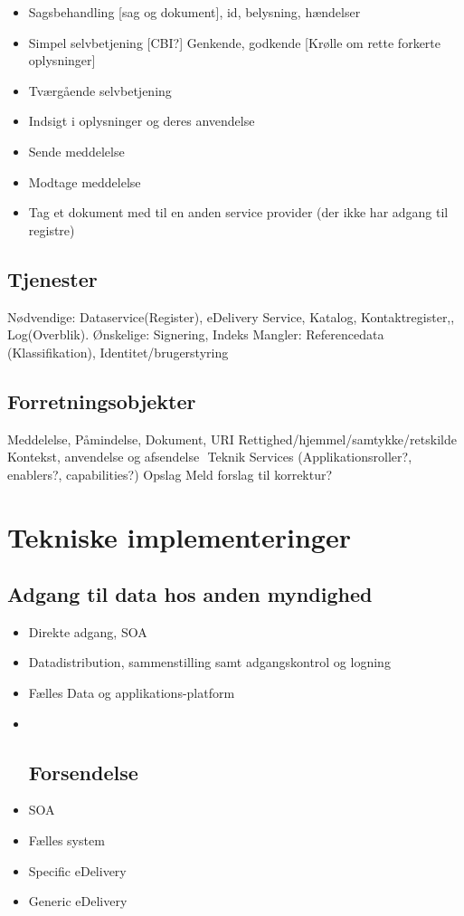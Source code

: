 \begin{itemize}
\item
  Sagsbehandling {[}sag og dokument{]}, id, belysning, hændelser
\item
  Simpel selvbetjening {[}CBI?{]} Genkende, godkende {[}Krølle om rette
  forkerte oplysninger{]}
\item
  Tværgående selvbetjening
\item
  Indsigt i oplysninger og deres anvendelse
\item
  Sende meddelelse
\item
  Modtage meddelelse
\item
  Tag et dokument med til en anden service provider (der ikke har adgang
  til registre)
\end{itemize}

\subsection{Tjenester}\label{tjenester}

Nødvendige: Dataservice(Register), eDelivery Service, Katalog,
Kontaktregister,, Log(Overblik). Ønskelige: Signering, Indeks Mangler:
Referencedata (Klassifikation), Identitet/brugerstyring

\subsection{Forretningsobjekter}\label{forretningsobjekter}

Meddelelse, Påmindelse, Dokument, URI
Rettighed/hjemmel/samtykke/retskilde Kontekst, anvendelse og afsendelse 
Teknik Services (Applikationsroller?, enablers?, capabilities?) Opslag
Meld forslag til korrektur?

\section{Tekniske implementeringer}\label{tekniske-implementeringer}

\subsection{Adgang til data hos anden
myndighed}\label{adgang-til-data-hos-anden-myndighed}

\begin{itemize}
\item
  Direkte adgang, SOA
\item
  Datadistribution, sammenstilling samt adgangskontrol og logning
\item
  Fælles Data og applikations-platform
\item ~
  \subsection{Forsendelse}\label{forsendelse}
\item
  SOA
\item
  Fælles system
\item
  Specific eDelivery
\item
  Generic eDelivery
\end{itemize}

